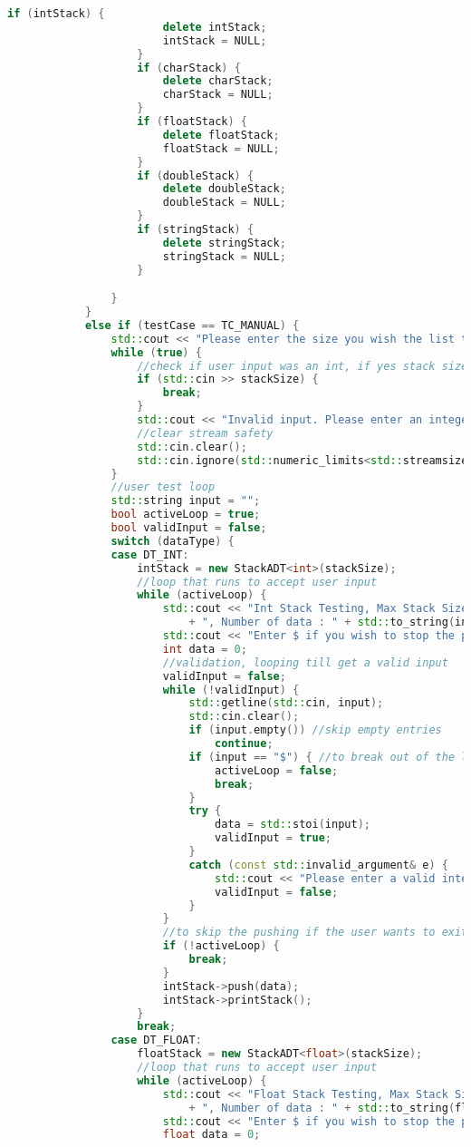 \documentclass{report}
\begin{document}
\begin{lstlisting}[language=C++]
					if (intStack) {
						delete intStack;
						intStack = NULL;
					}
					if (charStack) {
						delete charStack;
						charStack = NULL;
					}
					if (floatStack) {
						delete floatStack;
						floatStack = NULL;
					}
					if (doubleStack) {
						delete doubleStack;
						doubleStack = NULL;
					}
					if (stringStack) {
						delete stringStack;
						stringStack = NULL;
					}

				}
			}
			else if (testCase == TC_MANUAL) {
				std::cout << "Please enter the size you wish the list to be." << std::endl;
				while (true) {
					//check if user input was an int, if yes stack size determined
					if (std::cin >> stackSize) {
						break;
					}
					std::cout << "Invalid input. Please enter an integer." << std::endl;
					//clear stream safety
					std::cin.clear();
					std::cin.ignore(std::numeric_limits<std::streamsize>::max(), '\n');
				}
				//user test loop
				std::string input = "";
				bool activeLoop = true;
				bool validInput = false;
				switch (dataType) {
				case DT_INT:
					intStack = new StackADT<int>(stackSize);
					//loop that runs to accept user input
					while (activeLoop) {
						std::cout << "Int Stack Testing, Max Stack Size : " + std::to_string(stackSize)
							+ ", Number of data : " + std::to_string(intStack->getSize()) << std::endl;
						std::cout << "Enter $ if you wish to stop the process." << std::endl;
						int data = 0;
						//validation, looping till get a valid input
						validInput = false;
						while (!validInput) {
							std::getline(std::cin, input);
							std::cin.clear();
							if (input.empty()) //skip empty entries
								continue;
							if (input == "$") { //to break out of the loop
								activeLoop = false;
								break;
							}
							try {
								data = std::stoi(input);
								validInput = true;
							}
							catch (const std::invalid_argument& e) {
								std::cout << "Please enter a valid integer" << std::endl;
								validInput = false;
							}
						}
						//to skip the pushing if the user wants to exit
						if (!activeLoop) {
							break;
						}
						intStack->push(data);
						intStack->printStack();
					}
					break;
				case DT_FLOAT:
					floatStack = new StackADT<float>(stackSize);
					//loop that runs to accept user input
					while (activeLoop) {
						std::cout << "Float Stack Testing, Max Stack Size : " + std::to_string(stackSize)
							+ ", Number of data : " + std::to_string(floatStack->getSize()) << std::endl;
						std::cout << "Enter $ if you wish to stop the process." << std::endl;
						float data = 0;

\end{lstlisting}
\end{document}
